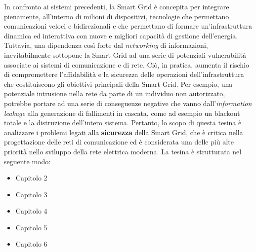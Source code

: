 In confronto ai sistemi precedenti, la Smart Grid è concepita per integrare pienamente, all'interno di milioni di dispositivi, tecnologie che permettano comunicazioni veloci e bidirezionali e che permettano di formare un'infrastruttura dinamica ed interattiva con nuove e migliori capacità di gestione dell'energia. Tuttavia, una dipendenza così forte dal \textit{networking} di informazioni, inevitabilmente sottopone la Smart Grid ad una serie di potenziali vulnerabilità associate ai sistemi di comunicazione e di rete. Ciò, in pratica, aumenta il rischio di compromettere l'affidabilità e la sicurezza delle operazioni dell'infrastruttura che costituiscono gli obiettivi principali della Smart Grid. Per esempio, una potenziale intrusione nella rete da parte di un individuo non autorizzato, potrebbe portare ad una serie di conseguenze negative che vanno dall'\textit{information leakage} alla generazione di fallimenti in cascata, come ad esempio un blackout totale e la distruzione dell'intero sistema. \newline Pertanto, lo scopo di questa tesina è analizzare i problemi legati alla \textbf{sicurezza} della Smart Grid, che è critica nella progettazione delle reti di comunicazione ed è considerata una delle più alte priorità nello sviluppo della rete elettrica moderna.
\newline \newline
La tesina è strutturata nel seguente modo:
\begin{itemize}
\item Capitolo 2
\item Capitolo 3
\item Capitolo 4
\item Capitolo 5
\item Capitolo 6
\end{itemize}